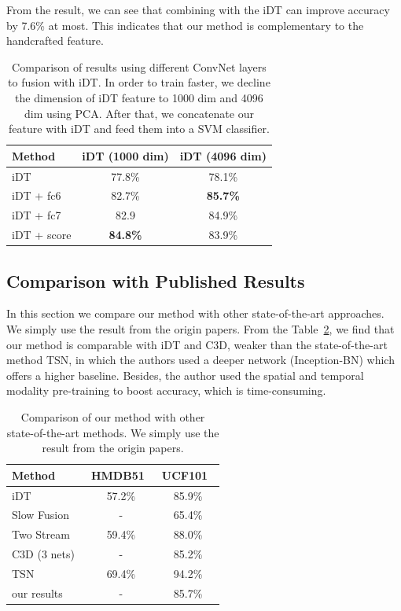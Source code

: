 \documentclass[10pt,twocolumn,letterpaper]{article}
\begin{document}
From the result, we can see that combining with the iDT can improve accuracy by 7.6\% at most. This indicates that our method is complementary to the handcrafted feature. 
\begin{table}
	\begin{center}
		\begin{tabular}{|l|c|c|}
			\hline
			Method 								& iDT (1000 dim) 			& iDT (4096 dim) 		\\
			\hline
			iDT 								& 77.8\% 				& 78.1\% 			\\
			iDT + fc6 							& 82.7\% 				& \textbf{85.7\%} 	\\
			iDT + fc7							& 82.9 					& 84.9\% 			\\
			iDT + score							& \textbf{84.8\%} 	& 83.9\% 			\\
			\hline																				
		\end{tabular}
	\end{center}
	\caption{Comparison of results using different ConvNet layers to fusion with iDT. In order to train faster, we decline the dimension of iDT feature to 1000 dim and 4096 dim using PCA. After that, we concatenate our feature with iDT and feed them into a SVM classifier.}
	\label{table:iDT}
\end{table}

\subsection{Comparison with Published Results}
In this section we compare our method with other state-of-the-art approaches. We simply use the result from the origin papers. From the Table~\ref{table:all_result}, we find that our method is comparable with iDT and C3D, weaker than the state-of-the-art method TSN, in which the authors used a deeper network (Inception-BN) which offers a higher baseline.  Besides, the author used the spatial and temporal modality pre-training to boost accuracy, which is time-consuming.  
\begin{table}
	\begin{center}
		\begin{tabular}{|l|c|c|}
			\hline
			Method & HMDB51~\cite{Kuehne11} & UCF101~\cite{soomro2012ucf101} \\
			\hline
			iDT~\cite{wang2013action} 											& 57.2\% 	& 85.9\% \\
			Slow Fusion~\cite{karpathy2014large}   								& - 		& 65.4\% \\
			Two Stream~\cite{simonyan2014two} 									& 59.4\% 	& 88.0\% \\
			C3D (3 nets)~\cite{Tran_2015_ICCV}									& - 		& 85.2\% \\
			TSN~\cite{wang2016temporal}											& 69.4\%	& 94.2\% \\
			our results															& - 		& 85.7\% \\
			\hline
		\end{tabular}
	\end{center}
	\caption{Comparison of our method with other state-of-the-art methods. We simply use the result from the origin papers.}
	\label{table:all_result}
\end{table}
\end{document}
